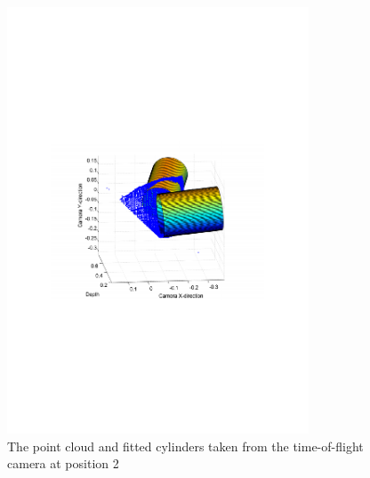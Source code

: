 \begin{figure}[htbp]
    \centering
    \includegraphics[width=0.8\textwidth]{pics/pos21-control-tof-3d}
    \caption{The point cloud and fitted cylinders taken from the time-of-flight camera at
    position 2}
    \label{chap7:fig-pso21-control-tof-3d}
\end{figure}
